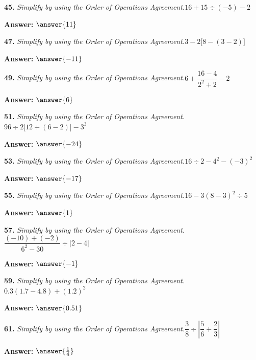 \documentclass{ximera}
\begin{document}
\begin{problem}
\textbf{45.} \emph{Simplify by using the Order of Operations Agreement.}\quad $16 + 15 \div (-5) - 2$

\textbf{Answer:} $\answer{11}$
\end{problem}

\begin{problem}
\textbf{47.} \emph{Simplify by using the Order of Operations Agreement.}\quad $3 - 2\bigl[8 - (3 - 2)\bigr]$

\textbf{Answer:} $\answer{-11}$
\end{problem}

\begin{problem}
\textbf{49.} \emph{Simplify by using the Order of Operations Agreement.}\quad $6 + \dfrac{16 - 4}{2^2 + 2} - 2$

\textbf{Answer:} $\answer{6}$
\end{problem}

\begin{problem}
\textbf{51.} \emph{Simplify by using the Order of Operations Agreement.}\quad $96 \div 2\bigl[12 + (6 - 2)\bigr] - 3^3$

\textbf{Answer:} $\answer{-24}$
\end{problem}

\begin{problem}
\textbf{53.} \emph{Simplify by using the Order of Operations Agreement.}\quad $16 \div 2 - 4^2 - (-3)^2$

\textbf{Answer:} $\answer{-17}$
\end{problem}

\begin{problem}
\textbf{55.} \emph{Simplify by using the Order of Operations Agreement.}\quad $16 - 3(8 - 3)^2 \div 5$

\textbf{Answer:} $\answer{1}$
\end{problem}

\begin{problem}
\textbf{57.} \emph{Simplify by using the Order of Operations Agreement.}\quad $\dfrac{(-10) + (-2)}{6^2 - 30} \div |2 - 4|$

\textbf{Answer:} $\answer{-1}$
\end{problem}

\begin{problem}
\textbf{59.} \emph{Simplify by using the Order of Operations Agreement.}\quad $0.3(1.7 - 4.8) + (1.2)^2$

\textbf{Answer:} $\answer{0.51}$
\end{problem}

\begin{problem}
\textbf{61.} \emph{Simplify by using the Order of Operations Agreement.}\quad $\dfrac{3}{8} \div \left|\dfrac{5}{6} + \dfrac{2}{3}\right|$

\textbf{Answer:} $\answer{\frac{1}{4}}$
\end{problem}
\end{document}
